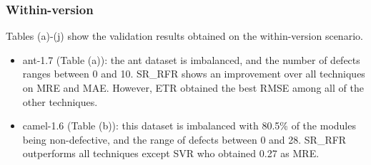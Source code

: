 \documentclass[]{article}
\begin{document}
	\subsubsection{Within-version}
	Tables (a)-(j) show the validation results obtained on the within-version scenario.
	\begin{itemize}
		\item ant-1.7 (Table (a)): the ant dataset is imbalanced, and the number of defects ranges between 0 and 10. SR\_RFR shows an improvement over all techniques on MRE and MAE. However, ETR obtained the best RMSE among all of the other techniques.
		\item camel-1.6 (Table (b)): this dataset is imbalanced with 80.5\% of the modules being non-defective, and the range of defects between 0 and 28. SR\_RFR outperforms all techniques except SVR who obtained 0.27 as MRE.
	\end{itemize}
\end{document}
